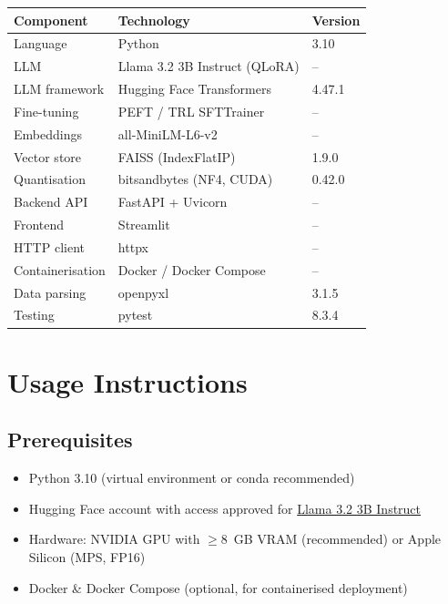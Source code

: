 \documentclass[12pt,a4paper]{article}
\begin{document}
\begin{center}
\begin{tabular}{lll}
  \toprule
  Component         & Technology                          & Version \\
  \midrule
  Language          & Python                              & 3.10    \\
  LLM               & Llama 3.2 3B Instruct (QLoRA)      & --      \\
  LLM framework     & Hugging Face Transformers           & 4.47.1  \\
  Fine-tuning       & PEFT / TRL SFTTrainer               & --      \\
  Embeddings        & all-MiniLM-L6-v2                    & --      \\
  Vector store      & FAISS (IndexFlatIP)                 & 1.9.0   \\
  Quantisation      & bitsandbytes (NF4, CUDA)            & 0.42.0  \\
  Backend API       & FastAPI + Uvicorn                   & --      \\
  Frontend          & Streamlit                           & --      \\
  HTTP client       & httpx                               & --      \\
  Containerisation  & Docker / Docker Compose             & --      \\
  Data parsing      & openpyxl                            & 3.1.5   \\
  Testing           & pytest                              & 8.3.4   \\
  \bottomrule
\end{tabular}
\end{center}

\section{Usage Instructions}

\subsection{Prerequisites}

\begin{itemize}
  \item Python 3.10 (virtual environment or conda recommended)
  \item Hugging Face account with access approved for
        \href{https://huggingface.co/meta-llama/Llama-3.2-3B-Instruct}{Llama 3.2 3B Instruct}
  \item Hardware: NVIDIA GPU with $\geq$8~GB VRAM (recommended) or Apple Silicon
        (MPS, FP16)
  \item Docker \& Docker Compose (optional, for containerised deployment)
\end{itemize}
\end{document}
